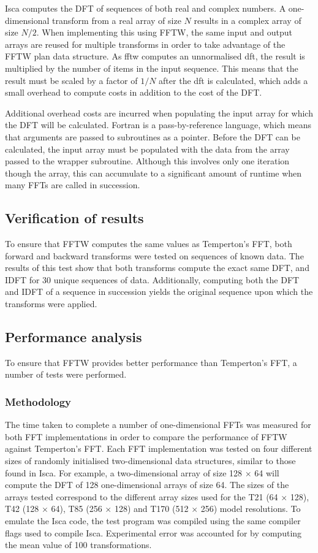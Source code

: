 \documentclass[a4paper,11pt]{report}
\begin{document}
\par
Isca computes the DFT of sequences of both real and complex numbers. A one-dimensional transform from a real array of size $N$ results in a complex array of size $N/2$. When implementing this using FFTW, the same input and output arrays are reused for multiple transforms in order to take advantage of the FFTW plan data structure. As \gls{fftw} computes an unnormalised \gls{dft}, the result is multiplied by the number of items in the input sequence. This means that the result must be scaled by a factor of $1/N$ after the \gls{dft} is calculated, which adds a small overhead to compute costs in addition to the cost of the DFT.  
\par
Additional overhead costs are incurred when populating the input array for which the DFT will be calculated. Fortran is a pass-by-reference language, which means that arguments are passed to subroutines as a pointer. Before the DFT can be calculated, the input array must be populated with the data from the array passed to the wrapper subroutine. Although this involves only one iteration though the array, this can accumulate to a significant amount of runtime when many FFTs are called in succession.

\subsection{Verification of results}
To ensure that FFTW computes the same values as Temperton's FFT, both forward and backward transforms were tested on sequences of known data. The results of this test show that both transforms compute the exact same DFT, and IDFT for 30 unique sequences of data. Additionally, computing both the DFT and IDFT of a sequence in succession yields the original sequence upon which the transforms were applied.

\subsection{Performance analysis}
To ensure that FFTW provides better performance than Temperton's FFT, a number of tests were performed. 

\subsubsection{Methodology}

The time taken to complete a number of one-dimensional FFTs was measured for both FFT implementations in order to compare the performance of FFTW against Temperton's FFT. Each FFT implementation was tested on four different sizes of randomly initialised two-dimensional data structures, similar to those found in Isca. For example, a two-dimensional array of size 128 $\times$ 64 will compute the DFT of 128 one-dimensional arrays of size 64. The sizes of the arrays tested correspond to the different array sizes used for the T21 (64 $\times$ 128), T42 (128 $\times$ 64), T85 (256 $\times$ 128) and T170 (512 $\times$ 256) model resolutions. To emulate the Isca code, the test program was compiled using the same compiler flags used to compile Isca. Experimental error was accounted for by computing the mean value of 100 transformations.
\end{document}
